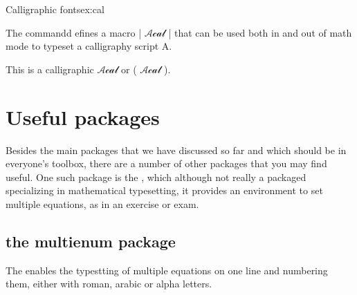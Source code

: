 {\begin{texexample}{Calligraphic fonts}{ex:cal}

\newcommand{\Acal}{\ifmmode \mathcal{Acal} \else \(\) \fi}
The commandd efines a macro |\Acal| that can be used both in and out of math mode to typeset a calligraphy script A. 

This is a calligraphic {\Acal} or ({\Acal}).
\end{texexample}


\section{Useful packages}

Besides the main packages that we have discussed so far and which should be in everyone's toolbox, there are a number of other packages that you may find useful. One such package is the , which although not really a packaged specializing in mathematical typesetting, it provides an environment to set multiple equations, as in an exercise or exam.



\subsection{the multienum package}

The  enables  the typestting of multiple equations on one line and numbering them, either with roman, arabic or alpha letters.



\begin{multienumerate}[oddlist]
\end{multienumerate}
\begin{multienumerate}[evenlist]
\end{multienumerate}


}
